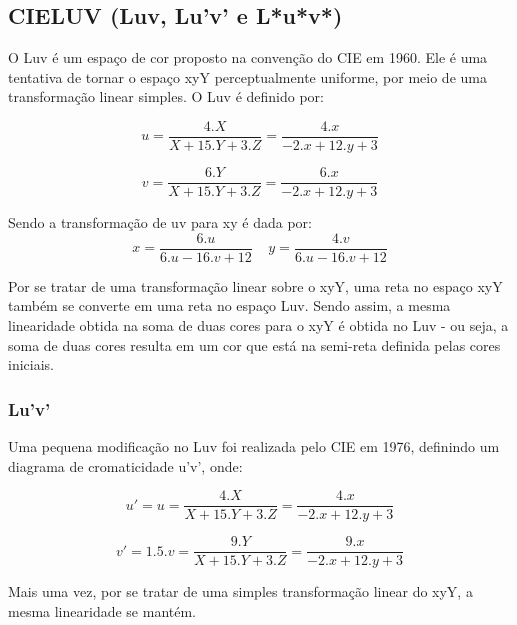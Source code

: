 \subsection{CIELUV (Luv, Lu'v' e L*u*v*)}
\par
O Luv é um espaço de cor proposto na convenção do CIE em 1960. Ele é uma
tentativa de tornar o espaço xyY perceptualmente uniforme, por meio de uma
transformação linear simples. O Luv é definido por:

\begin{equation}\label{eq:Luv_u}
u=\frac{4.X}{X+15.Y+3.Z}=\frac{4.x}{-2.x+12.y+3}
\end{equation}

\begin{equation}\label{eq:Luv_v}
v=\frac{6.Y}{X+15.Y+3.Z}=\frac{6.x}{-2.x+12.y+3}
\end{equation}

\par
Sendo a transformação de uv para xy é dada por:
\begin{equation}\label{eq:Luv_xy}
x=\frac{6.u}{6.u-16.v+12}\;\;\;\; y=\frac{4.v}{6.u-16.v+12}
\end{equation}

\par
Por se tratar de uma transformação linear sobre o xyY, uma reta no espaço xyY 
também se converte em uma reta no espaço Luv. Sendo assim, a mesma linearidade
obtida na soma de duas cores para o xyY é obtida no Luv - ou seja, a soma de
duas cores resulta em um cor que está na semi-reta definida pelas cores
iniciais.

\subsubsection{Lu'v'}
\par
Uma pequena modificação no Luv foi realizada pelo CIE em 1976, definindo um
diagrama de cromaticidade u'v', onde: 

\begin{equation}\label{eq:Lu'v'_u'}
u'=u=\frac{4.X}{X+15.Y+3.Z}=\frac{4.x}{-2.x+12.y+3}
\end{equation}

\begin{equation}\label{eq:Lu'v'_v'}
v'=1.5.v=\frac{9.Y}{X+15.Y+3.Z}=\frac{9.x}{-2.x+12.y+3}
\end{equation}

\par
Mais uma vez, por se tratar de uma simples transformação linear do xyY, a mesma
linearidade se mantém.

